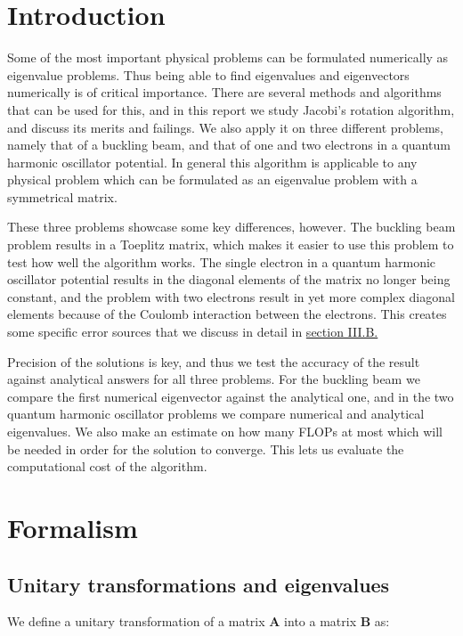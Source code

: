 \documentclass[reprint,english,notitlepage]{revtex4-1}  %
\begin{document}
\section{Introduction} \label{sec:I}

Some of the most important physical problems can be formulated numerically as eigenvalue problems. Thus being able to find eigenvalues and eigenvectors numerically is of critical importance. There are several methods and algorithms that can be used for this, and in this report we study Jacobi's rotation algorithm, and discuss its merits and failings. We also apply it on three different problems, namely that of a buckling beam, and that of one and two electrons in a quantum harmonic oscillator potential. In general this algorithm is applicable to any physical problem which can be formulated as an eigenvalue problem with a symmetrical matrix.

These three problems showcase some key differences, however. The buckling beam problem results in a Toeplitz matrix, which makes it easier to use this problem to test how well the algorithm works. The single electron in a quantum harmonic oscillator potential results in the diagonal elements of the matrix no longer being constant, and the problem with two electrons result in yet more complex diagonal elements because of the Coulomb interaction between the electrons. This creates some specific error sources that we discuss in detail in \hyperref[sec:III:b]{section III.B.}

Precision of the solutions is key, and thus we test the accuracy of the result against analytical answers for all three problems. For the buckling beam we compare the first numerical eigenvector against the analytical one, and in the two quantum harmonic oscillator problems we compare numerical and analytical eigenvalues. We also make an estimate on how many FLOPs at most which will be needed in order for the solution to converge. This lets us evaluate the computational cost of the algorithm.

\section{Formalism} \label{sec:II}

\subsection{Unitary transformations and eigenvalues} \label{sec:II:a}

We define a unitary transformation of a matrix \textbf{A} into a matrix \textbf{B} as:
\end{document}
